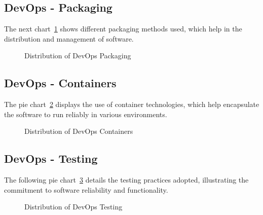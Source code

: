 \subsection{DevOps - Packaging}

The next chart~\ref{fig:devops-packaging} shows different packaging methods used, which help in the distribution and management of software.

\begin{figure}[H]
\centering
{}
\caption{Distribution of DevOps Packaging}
\label{fig:devops-packaging}
\end{figure}


\subsection{DevOps - Containers}

The pie chart~\ref{fig:devops-containers} displays the use of container technologies, which help encapsulate the software to run reliably in various environments.

\begin{figure}[H]
\centering
{}
\caption{Distribution of DevOps Containers}
\label{fig:devops-containers}
\end{figure}


\subsection{DevOps - Testing}

The following pie chart~\ref{fig:devops-testing} details the testing practices adopted, illustrating the commitment to software reliability and functionality.

\begin{figure}[H]
\centering
{}
\caption{Distribution of DevOps Testing}
\label{fig:devops-testing}
\end{figure}


%














